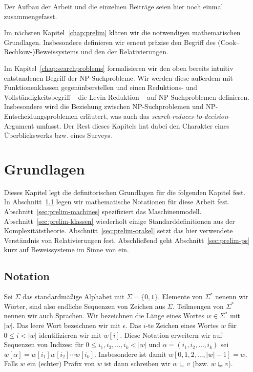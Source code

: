 Der Aufbau der Arbeit und die einzelnen Beiträge seien hier noch einmal zusammengefasst.

Im nächsten Kapitel~\ref{chap:prelim} klären wir die notwendigen mathematischen Grundlagen. Insbesondere definieren wir erneut präzise den Begriff des (Cook--Rechkow-)Beweissystems und den der Relativierungen.

Im Kapitel~\ref{chap:searchproblems} formalisieren wir den oben bereits intuitiv entstandenen Begriff der NP-Suchprobleme. Wir werden diese außerdem mit Funktionenklassen gegenünberstellen und einen Reduktions- und Vollständigkeitsbegriff -- die Levin-Reduktion -- auf NP-Suchproblemen definieren.
Insbesondere wird die Beziehung zwischen NP-Suchproblemen und NP-Entscheidungsproblemen erläutert, was auch das \emph{search-reduces-to-decision}-Argument umfasst. Der Rest dieses Kapitels hat dabei den Charakter eines Überblickswerks bzw. eines Surveys.





\chapter{Grundlagen}

Dieses Kapitel legt die definitorischen Grundlagen für die folgenden Kapitel fest. In Abschnitt~\ref{sec:notation} legen wir mathematische Notationen für diese Arbeit fest. Abschnitt~\ref{sec:prelim-machines} spezifiziert das Maschinenmodell.  Abschnitt~\ref{sec:prelim-klassen} wiederholt einige Standarddefinitionen aus der Komplexitätstheorie. Abschnitt~\ref{sec:prelim-orakel} setzt das hier verwendete Verständnis von Relativierungen fest. Abschließend geht Abschnitt~\ref{sec:prelim-ps} kurz auf Beweissysteme im Sinne von \textcite{cook_relative_1979} ein.

\section{Notation}\label{sec:notation}

Sei $\Sigma$ das standardmäßige Alphabet mit $\Sigma=\{0,1\}$. Elemente von $\Sigma^*$ nenenn wir Wörter, sind also endliche Sequenzen von Zeichen aus $\Sigma$. Teilmengen von $\Sigma^*$ nennen wir auch Sprachen. Wir bezeichnen die Länge eines Wortes $w\in\Sigma^*$ mit $|w|$. Das leere Wort bezeichnen wir mit $\epsilon$. Das $i$-te Zeichen eines Wortes $w$ für $0\leq i< |w|$ identifizieren wir mit $w[i]$. Diese Notation erweitern wir auf Sequenzen von Indizes: für $0\leq i_1, i_2, \dots, i_k< |w|$ und $\alpha=(i_1, i_2, \dots, i_k)$ sei $w[\alpha] = w[i_1]w[i_2]\cdots w[i_k]$. Insbesondere ist damit $w[0,1,2,\dots, |w|-1]= w$.
Falls $w$ ein (echter) Präfix von $w$ ist dann schreiben wir $w \sqsubseteq v$ (bzw. $w\sqsubsetneq v$).

